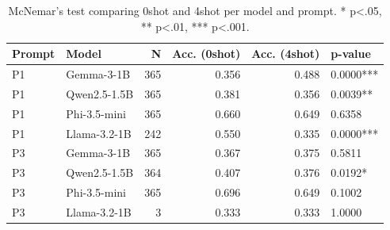 \begin{table}
\caption{McNemar's test comparing 0shot and 4shot per model and prompt. * p<.05, ** p<.01, *** p<.001.}
\label{tab:mcnemar}
\begin{tabular}{llrrrl}
\toprule
Prompt & Model & N & Acc. (0shot) & Acc. (4shot) & p-value \\
\midrule
P1 & Gemma-3-1B & 365 & 0.356 & 0.488 & 0.0000*** \\
P1 & Qwen2.5-1.5B & 365 & 0.381 & 0.356 & 0.0039** \\
P1 & Phi-3.5-mini & 365 & 0.660 & 0.649 & 0.6358 \\
P1 & Llama-3.2-1B & 242 & 0.550 & 0.335 & 0.0000*** \\
P3 & Gemma-3-1B & 365 & 0.367 & 0.375 & 0.5811 \\
P3 & Qwen2.5-1.5B & 364 & 0.407 & 0.376 & 0.0192* \\
P3 & Phi-3.5-mini & 365 & 0.696 & 0.649 & 0.1002 \\
P3 & Llama-3.2-1B & 3 & 0.333 & 0.333 & 1.0000 \\
\bottomrule
\end{tabular}
\end{table}
